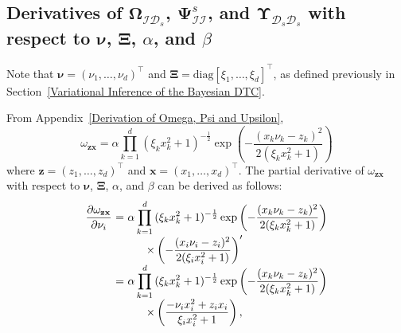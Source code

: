 \documentclass[conference]{IEEEtran}
\begin{document}
	\subsection{Derivatives of $\mathbf{\Omega}_{\mathcal{I}\mathcal{D}_s}$, $\mathbf{\Psi}^s_\mathcal{II}$, and $\mathbf{\Upsilon}_{\mathcal{D}_s\mathcal{D}_s}$ with respect to $\boldsymbol{\nu}$, $\mathbf{\Xi}$, $\alpha$, and $\beta$}
	\label{argghh}
	\hspace{2mm}Note that $\boldsymbol{\nu}= (\nu_1,\ldots,\nu_d)^\top$ and $\mathbf{\Xi}=\mathrm{diag}[\xi_1,\ldots,\xi_d]^\top$, as defined previously in Section~\ref{Variational Inference of the Bayesian DTC}.
	
	From Appendix~\ref{Derivation of Omega, Psi and Upsilon},
	\begin{equation*}
		\omega_\mathbf{zx}=\alpha \prod_{k=1}^{d}{(\xi_kx_{k}^2+1)^{-\frac{1}{2}}}\exp\left(-\frac{(x_{k}\nu_k-z_{k})^2}{2(\xi_kx_{k}^2+1)}\right)
	\end{equation*}
	where $\mathbf{z} = (z_1,\ldots,z_d)^\top$ and $\mathbf{x} = (x_1,\ldots,x_d)^\top$.	
	The partial derivative of $\omega_\mathbf{zx}$ with respect to $\boldsymbol{\nu}$, $\mathbf{\Xi}$, $\alpha$, and $\beta$ can be derived as follows:
	\begin{equation*}
		\begin{array}{rcl}
			\displaystyle\dfrac{\partial\omega_\mathbf{zx}}{\partial\nu_i}&\hspace{-2.4mm}=&\hspace{-2.4mm} \displaystyle\alpha \prod_{k=1}^{d}{(\xi_kx_{k}^2+1)^{-\frac{1}{2}}}\exp\left(-\frac{(x_{k}\nu_k-z_{k})^2}{2(\xi_kx_{k}^2+1)}\right)\\
			&&\displaystyle\quad\times\left(-\frac{(x_{i}\nu_i-z_{i})^2}{2(\xi_ix_{i}^2+1)}\right)^\prime\\
			&\hspace{-2.4mm}=&\hspace{-2.4mm} \displaystyle\alpha \prod_{k=1}^{d}{(\xi_kx_{k}^2+1)^{-\frac{1}{2}}}\exp\left(-\frac{(x_{k}\nu_k-z_{k})^2}{2(\xi_kx_{k}^2+1)}\right)\\
			&&\displaystyle\quad\times\left(\dfrac{-\nu_ix_{i}^2+z_{i}x_{i}}{\xi_ix_{i}^2+1}\right),
		\end{array}
	\end{equation*}
\end{document}
